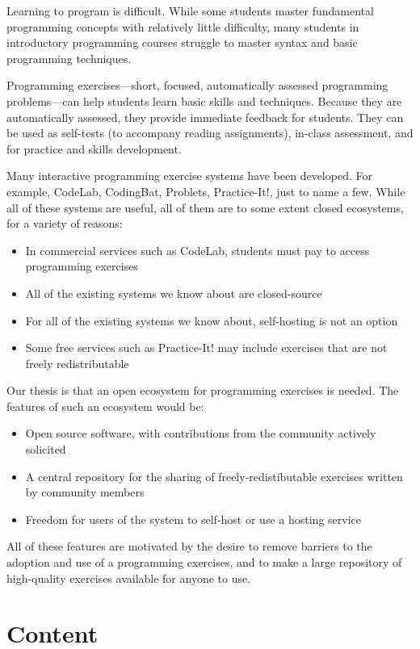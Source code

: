 \documentclass[11pt]{article}
\newcommand{\BI}{\begin{itemize}[itemsep=.05in,parsep=0in]}
\newcommand{\EI}{\end{itemize}}
\begin{document}
Learning to program is difficult.  While some students master
fundamental programming concepts with relatively little difficulty,
many students in introductory programming courses struggle
to master syntax and basic programming techniques.

Programming exercises---short, focused, automatically assessed
programming problems---can help students learn basic skills and techniques.
Because they are automatically assessed, they provide immediate feedback
for students.  They can be used as self-tests (to accompany reading assignments),
in-class assessment, and for practice and skills development.

Many interactive programming exercise systems have been developed.
For example, CodeLab, CodingBat, Problets, Practice-It!, just to
name a few.  While all of these systems are useful, all of
them are to some extent closed ecosystems, for a variety of reasons:

\BI
\item In commercial services such as CodeLab,
      students must pay to access programming exercises
\item All of the existing systems we know about are closed-source
\item For all of the existing systems we know about,
      self-hosting is not an option
\item Some free services such as Practice-It! may include
      exercises that are not freely redistributable
\EI

Our thesis is that an open ecosystem for programming exercises
is needed.  The features of such an ecosystem would be:

\BI
\item Open source software, with contributions from the community
      actively solicited
\item A central repository for the sharing of freely-redistibutable exercises
      written by community members
\item Freedom for users of the system to self-host or use a hosting service
\EI

All of these features are motivated by the desire to remove 
barriers to the adoption and use of a programming exercises,
and to make a large repository of high-quality exercises available
for anyone to use.

\section*{Content}
\end{document}
